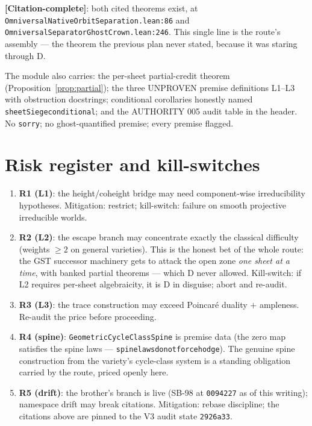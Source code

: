 \documentclass[11pt]{article}
\renewcommand{\_}{\textunderscore\allowbreak}
\newcommand{\status}[1]{\textbf{[#1]}}
\begin{document}
\status{Citation-complete}: both cited theorems exist, at \linebreak
\texttt{OmniversalNativeOrbitSeparation.lean:86} and
\texttt{OmniversalSeparatorGhostCrown.lean:246}. This single line is the
route's assembly --- the theorem the previous plan never stated, because it
was staring through D.

The module also carries: the per-sheet partial-credit theorem
(Proposition~\ref{prop:partial}); the three UNPROVEN premise definitions L1--L3
with obstruction docstrings; conditional corollaries honestly named
\texttt{sheetSiege\_conditional\_*}; and the AUTHORITY 005 audit table in the
header. No \texttt{sorry}; no ghost-quantified premise; every premise flagged.

\section{Risk register and kill-switches}\label{sec:risks}

\begin{enumerate}[leftmargin=2em]
\item \textbf{R1 (L1)}: the height/coheight bridge may need component-wise
irreducibility hypotheses. Mitigation: restrict; kill-switch: failure on
smooth projective irreducible worlds.
\item \textbf{R2 (L2)}: the escape branch may concentrate exactly the
classical difficulty (weights $\ge 2$ on general varieties). This is the
honest bet of the whole route: the GST successor machinery gets to attack the
open zone \emph{one sheet at a time}, with banked partial theorems ---
which D never allowed. Kill-switch: if L2 requires per-sheet algebraicity, it
is D in disguise; abort and re-audit.
\item \textbf{R3 (L3)}: the trace construction may exceed Poincar\'e duality
$+$ ampleness. Re-audit the price before proceeding.
\item \textbf{R4 (spine)}: \texttt{GeometricCycleClassSpine} is premise data
(the zero map satisfies the spine laws --- \texttt{spine\_laws\_do\_not\_force\_hodge}).
The genuine spine construction from the variety's cycle-class system is a
standing obligation carried by the route, priced openly here.
\item \textbf{R5 (drift)}: the brother's branch is live (SB-98 at
\texttt{0094227} as of this writing); namespace drift may break citations.
Mitigation: rebase discipline; the citations above are pinned to the V3 audit
state \texttt{2926a33}.
\end{enumerate}
\end{document}
